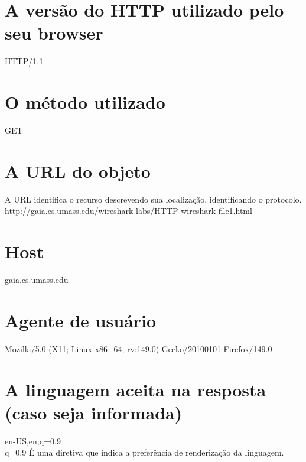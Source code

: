 \begin{parts}
    \part{A versão do HTTP utilizado pelo seu browser}
    \begin{solution}
        HTTP/1.1
    \end{solution}
    
    \part{O método utilizado}
    \begin{solution}
    GET
    \end{solution}

    \part{A URL do objeto}
    \begin{solution}
    A URL identifica o recurso descrevendo sua localização, identificando o protocolo.\\
    http://gaia.cs.umass.edu/wireshark-labs/HTTP-wireshark-file1.html
    \end{solution}

    \part{Host}
    \begin{solution}
    gaia.cs.umass.edu    
    \end{solution}
    
    \part{Agente de usuário}
    \begin{solution}
    Mozilla/5.0 (X11; Linux x86\_64; rv:149.0) Gecko/20100101 Firefox/149.0    
    \end{solution}
    
    \part{A linguagem aceita na resposta (caso seja informada)}
    \begin{solution}
    en-US,en;q=0.9\\
    q=0.9 É uma diretiva que indica a preferência de renderização da linguagem.
    \end{solution}
    

\end{parts}

